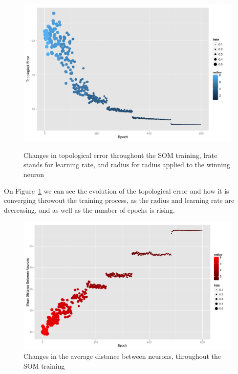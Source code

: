 \begin{figure}[h]
  \includegraphics[scale=0.6]{./plots/som/topological_error.pdf}
  \label{fig:top_error}
  \caption{Changes in topological error throughout the SOM training, lrate stands for learning rate, and radius for radius applied to the winning neuron}
\end{figure}

On Figure~\ref{fig:top_error} we can see the evolution of the topological error and how it is converging throwout the training process, as the radius and learning rate are decreasing, and as well as the number of epochs is rising. 

\begin{figure}[h]
  \centerline{\includegraphics[scale=0.6]{./plots/som/average_distance.pdf}}
  \label{fig:avg_dist}
  \caption{Changes in the average distance between neurons, throughout the SOM training}
\end{figure}

